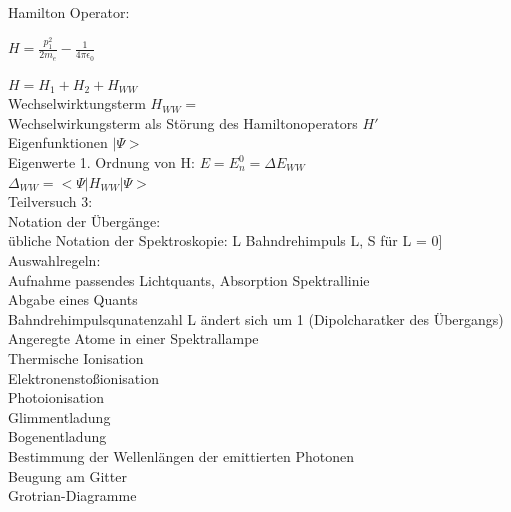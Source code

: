 \documentclass[12pt,oneside,oldfontcommands]{memoir}
\begin{document}
Hamilton Operator:

$H = \frac{p^2_1}{2m_e} - \frac{1}{4\pi \epsilon_0} $

$H = H_1 + H_2 + H_{WW}$ \\

Wechselwirktungsterm $H_{WW} = $ \\

Wechselwirkungsterm als Störung des Hamiltonoperators $H'$\\


Eigenfunktionen $| \Psi >$\\

Eigenwerte 1. Ordnung von H: $E = E^0_n = \Delta E_{WW}$\\

$\Delta_{WW} = < \Psi | H_{WW} | \Psi >$\\

Teilversuch 3:\\

Notation der Übergänge:\\
übliche Notation der Spektroskopie: L Bahndrehimpuls L, S für L = 0]\\


Auswahlregeln:\\
Aufnahme passendes Lichtquants, Absorption Spektrallinie\\
Abgabe eines Quants\\

Bahndrehimpulsqunatenzahl L ändert sich um 1 (Dipolcharatker des Übergangs)\\

Angeregte Atome in einer Spektrallampe\\

Thermische Ionisation\\

Elektronenstoßionisation\\

Photoionisation\\

Glimmentladung\\

Bogenentladung\\

Bestimmung der Wellenlängen der emittierten Photonen\\

Beugung am Gitter\\

Grotrian-Diagramme\\
\end{document}
